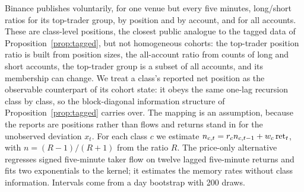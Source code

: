 \documentclass[12pt]{article}
\theoremstyle{definition}
\theoremstyle{remark}
\begin{document}
Binance publishes voluntarily, for one venue but every five minutes, long/short ratios for its top-trader group, by position and by account, and for all accounts. These are class-level positions, the closest public analogue to the tagged data of Proposition~\ref{prop:tagged}, but not homogeneous cohorts: the top-trader position ratio is built from position sizes, the all-account ratio from counts of long and short accounts, the top-trader group is a subset of all accounts, and its membership can change. We treat a class's reported net position as the observable counterpart of its cohort state: it obeys the same one-lag recursion class by class, so the block-diagonal information structure of Proposition~\ref{prop:tagged} carries over. The mapping is an assumption, because the reports are positions rather than flows and returns stand in for the unobserved deviation $x_t$. For each class $c$ we estimate $n_{c,t}=r_cn_{c,t-1}+w_c\,{\rm ret}_t$, with $n=(R-1)/(R+1)$ from the ratio $R$. The price-only alternative regresses signed five-minute taker flow on twelve lagged five-minute returns and fits two exponentials to the kernel; it estimates the memory rates without class information. Intervals come from a day bootstrap with 200 draws.
\end{document}
